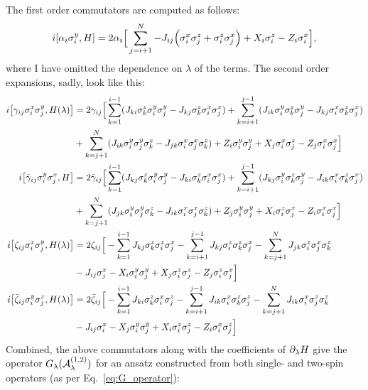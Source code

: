 The first order commutators are computed as follows:
\begin{equation}\label{eq:first_order_AGP_commutator}
        i\comm{\alpha_i \sy_i}{H} = 2\alpha_i \Big[ \sum_{j = i+1}^{N} - J_{ij} \Big( \sx_i \sz_j + \sz_i \sx_j \Big) + X_i \sz_i - Z_i \sx_i \Big],
\end{equation}
where I have omitted the dependence on $\lambda$ of the terms. The second order expansions, sadly, look like this:
\begin{equation}
    \begin{aligned}
        i\comm{\gamma_{ij} \sx_i \sy_j}{H(\lambda)} &= 2\gamma_{ij} \Big[ \sum_{k = 1}^{i-1} (J_{ki} \sz_k \sy_i \sy_j - J_{kj} \sz_k \sx_i \sx_j)  + \sum_{k = i + 1}^{j-1} (J_{ik} \sy_i \sz_k \sy_j - J_{kj} \sx_i \sz_k \sx_j) \\ 
        &+ \sum_{k = j + 1}^N (J_{ik} \sy_i \sy_j \sz_k - J_{jk} \sx_i \sx_j \sz_k) + Z_i \sy_i \sy_j + X_j \sx_i \sz_j - Z_j \sx_i \sx_j \Big] \\
        i\comm{\Bar{\gamma}_{ij} \sy_i \sx_j}{H} &= 2\Bar{\gamma}_{ij} \Big[ \sum_{k = 1}^{i-1} (J_{kj} \sz_k \sy_i \sy_j - J_{ki} \sz_k \sx_i \sx_j) + \sum_{k = i + 1}^{j-1} (J_{kj} \sy_i \sz_k \sy_j - J_{ik} \sx_i \sz_k \sx_j) \\ 
        &+ \sum_{k = j + 1}^N (J_{jk} \sy_i \sy_j \sz_k - J_{ik} \sx_i \sx_j \sz_k)+ Z_j \sy_i \sy_j + X_i \sz_i \sx_j - Z_i \sx_i \sx_j \Big] \\ 
        i\comm{\zeta_{ij} \sz_i \sy_j}{H(\lambda)} &= 2\zeta_{ij} \Big[ -\sum_{k = 1}^{i-1} J_{kj} \sz_k \sz_i \sx_j - \sum_{k = i + 1}^{j-1} J_{kj} \sz_i \sz_k \sx_j - \sum_{k = j + 1}^N J_{jk} \sz_i \sx_j \sz_k  \\
        &- J_{ij} \sx_j - X_i \sy_i \sy_j + X_j \sz_i \sz_j - Z_j \sz_i\sx_j \Big] \\
        i\comm{\Bar{\zeta}_{ij} \sy_i \sz_j}{H(\lambda)} &= 2\Bar{\zeta}_{ij} \Big[ - \sum_{k = 1}^{i-1} J_{ki} \sz_k \sx_i \sz_j - \sum_{k = i + 1}^{j-1} J_{ik} \sx_i \sz_k \sz_j 
        - \sum_{k = j + 1}^N J_{ik} \sx_i \sz_j \sz_k \\
        &- J_{ij} \sx_i - X_j \sy_i \sy_j + X_i \sz_i \sz_j - Z_i \sx_i \sz_j \Big]
    \end{aligned}
\end{equation}
Combined, the above commutators along with the coefficients of $\partial_{\lambda} H$ give the operator $G_{\lambda}(\mathcal{A}_{\lambda}^{(1,2)})$ for an ansatz  constructed from both single- and two-spin operators (as per Eq.~\eqref{eq:G_operator}):
